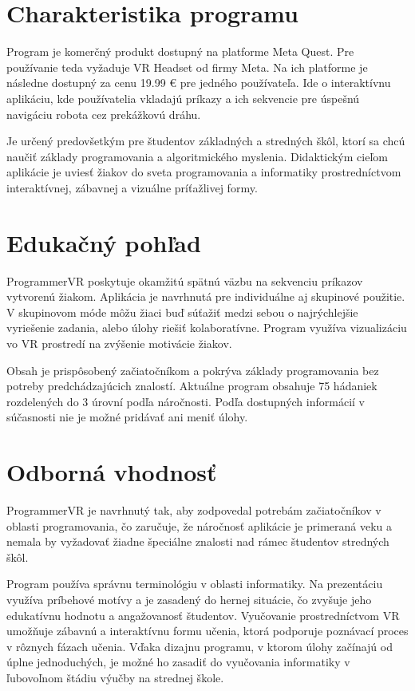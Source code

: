 \documentclass[a4paper,12pt]{article}
\begin{document}
\newpage


\section{Charakteristika programu}
Program je komerčný produkt dostupný na platforme Meta Quest.
Pre používanie teda vyžaduje VR Headset od firmy Meta. Na ich platforme je následne dostupný
za cenu 19.99 \euro{} pre jedného používateľa. Ide o interaktívnu aplikáciu, kde používatelia vkladajú
príkazy a ich sekvencie pre úspešnú navigáciu robota cez prekážkovú dráhu.


Je určený predovšetkým pre študentov základných a stredných škôl,
ktorí sa chcú naučiť základy programovania a algoritmického myslenia.
Didaktickým cieľom aplikácie je uviesť žiakov do sveta programovania a informatiky
prostredníctvom interaktívnej, zábavnej a vizuálne príťažlivej formy.


\section{Edukačný pohľad}
ProgrammerVR poskytuje okamžitú spätnú väzbu na sekvenciu príkazov vytvorenú žiakom.
Aplikácia je navrhnutá pre individuálne aj skupinové použitie. V skupinovom móde môžu žiaci buď
súťažiť medzi sebou o najrýchlejšie vyriešenie zadania, alebo úlohy riešiť kolaboratívne.
Program využíva vizualizáciu vo VR prostredí na zvýšenie motivácie žiakov.


Obsah je prispôsobený začiatočníkom a pokrýva základy programovania bez potreby predchádzajúcich znalostí.
Aktuálne program obsahuje 75 hádaniek rozdelených do 3 úrovní podľa náročnosti.
Podľa dostupných informácií v súčasnosti nie je možné pridávať ani meniť úlohy.


\section{Odborná vhodnosť}
ProgrammerVR je navrhnutý tak, aby zodpovedal potrebám začiatočníkov v oblasti programovania,
čo zaručuje, že náročnosť aplikácie je primeraná veku a nemala by vyžadovať žiadne špeciálne znalosti
nad rámec študentov stredných škôl.


Program používa správnu terminológiu v oblasti informatiky.
Na prezentáciu využíva príbehové motívy a je zasadený do hernej situácie,
čo zvyšuje jeho edukatívnu hodnotu a angažovanosť študentov.
Vyučovanie prostredníctvom VR umožňuje zábavnú a interaktívnu formu učenia,
ktorá podporuje poznávací proces v rôznych fázach učenia. Vďaka dizajnu programu, v ktorom úlohy
začínajú od úplne jednoduchých, je možné ho zasadiť do vyučovania informatiky v ľubovoľnom štádiu
výučby na strednej škole.
\end{document}
